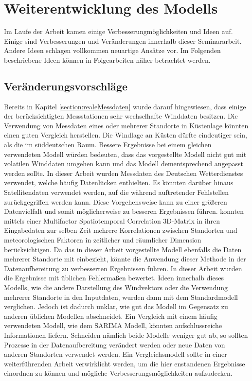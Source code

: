 \documentclass[
12pt, %
toc=listofnumbered, %
toc=chapterentrydotfill, %
numbers=noenddot, %
captions=tableheading, %
bibliography=numbered
]{scrreprt}
\let\Oldsection\section
\renewcommand{\section}{\FloatBarrier\Oldsection}
\let\Oldsubsection\subsection
\renewcommand{\subsection}{\FloatBarrier\Oldsubsection}
\begin{document}
\section{Weiterentwicklung des Modells}

Im Laufe der Arbeit kamen einige Verbesserungmöglichkeiten und Ideen auf. Einige sind Verbesserungen und Veränderungen innerhalb dieser Seminararbeit. 
Andere Ideen schlagen vollkommen neuartige Ansätze vor. Im Folgenden beschriebene Ideen können in Folgearbeiten näher betrachtet werden.

\subsection{Veränderungsvorschläge}

Bereits in Kapitel \ref{section:realeMessdaten} wurde darauf hingewiesen, dass einige der berücksichtigten Messstationen sehr wechselhafte Winddaten besitzen. Die Verwendung von Messdaten eines oder mehrerer Standorte in Küstenlage könnten einen guten Vergleich herstellen. 
Die Windlage an Küsten dürfte eindeutiger sein, als die im süddeutschen Raum. Bessere Ergebnisse bei einem gleichen verwendeten Modell würden bedeuten, dass das vorgestellte Modell nicht gut mit volatilen Winddaten umgehen kann und das Modell dementsprechend angepasst werden sollte.
\newline
In dieser Arbeit wurden Messdaten des Deutschen Wetterdienstes verwendet, welche häufig Datenlücken enthielten. Es könnten darüber hinaus Satellitendaten verwendet werden, auf die während auftretender Fehlstellen zurückgegriffen werden kann. 
Diese Vorgehensweise kann zu einer größeren Datenvielfalt und somit möglicherweise zu besseren Ergebnissen führen.
\newline
\citeauthor{2019_Chen_MultifactorSpatiotemporalCorrelation} \cite{2019_Chen_MultifactorSpatiotemporalCorrelation} konnten mittels einer Multifactor Spatiotemporal Correlation 3D-Matrix in ihren Eingabedaten zur selben Zeit mehrere Korrelationen zwischen Standorten und meteorologischen Faktoren in zeitlicher und räumlicher Dimension berücksichtigen. 
Da das in dieser Arbeit vorgestellte Modell ebenfalls die Daten mehrerer Standorte mit einbezieht, könnte die Anwendung dieser Methode in der Datenaufbereitung zu verbesserten Ergebnissen führen. 
\newline
In dieser Arbeit wurden die Ergebnisse mit üblichen Fehlermaßen bewertet. Ideen innerhalb dieses Modells, wie die andere Darstellung des Windvektors oder die Verwendung mehrerer Standorte in den Inputdaten, wurden dann mit dem Standardmodell verglichen. 
Jedoch ist dadurch unklar, wie gut das Modell im Gegensatz zu anderen üblichen Modellen abschneidet. Ein Vergleich mit einem häufig verwendeten Modell, wie dem SARIMA Modell, könnten aufschlussreiche Informationen liefern. 
Schneiden nämlich beide Modelle weniger gut ab, so sollten Prozesse in der Datenaufbereitung verändert werden oder neue Daten von anderen Standorten verwendet werden. Ein Vergleichsmodell sollte in einer weiterführenden Arbeit verwirklicht werden, um die hier enstandenen Ergebnisse einordnen zu können und mögliche Verbesserungsmöglichkeiten aufzudecken.
\end{document}
